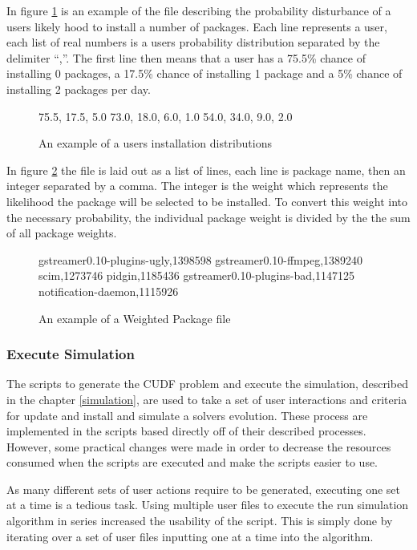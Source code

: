 In figure \ref{userprob} is an example of the file describing the probability disturbance of a users likely hood to install a number of packages.
Each line represents a user, each list of real numbers is a users probability distribution separated by the delimiter ``,''.
The first line then means that a user has a 75.5\% chance of installing 0 packages, a 17.5\% chance of installing 1 package and a 5\% chance of installing 2 packages per day.

\begin{figure}[htp]
\begin{center}
75.5, 17.5, 5.0
73.0, 18.0, 6.0, 1.0
54.0, 34.0, 9.0, 2.0
\caption[Install Distribution Example File]{An example of a users installation distributions}
\label{userprob}
\end{center}
\end{figure}

In figure \ref{packageprob} the file is laid out as a list of lines, each line is package name, then an integer separated by a comma.
The integer is the weight which represents the likelihood the package will be selected to be installed.
To convert this weight into the necessary probability, the individual package weight is divided by the the sum of all package weights. 

\begin{figure}[htp]
\begin{center}
gstreamer0.10-plugins-ugly,1398598
gstreamer0.10-ffmpeg,1389240
scim,1273746
pidgin,1185436
gstreamer0.10-plugins-bad,1147125
notification-daemon,1115926
\caption[Weighted Package File Example]{An example of a Weighted Package file }
\label{packageprob}
\end{center}
\end{figure}

\subsubsection{Execute Simulation}
The scripts to generate the CUDF problem and execute the simulation, described in the chapter \ref{simulation}, 
are used to take a set of user interactions and criteria for update and install and simulate a solvers evolution.
These process are implemented in the scripts based directly off of their described processes. 
However, some practical changes were made in order to decrease the resources consumed when the scripts are executed and make the scripts easier to use.

As many different sets of user actions require to be generated, executing one set at a time is a tedious task.
Using multiple user files to execute the run simulation algorithm in series increased the usability of the script.
This is simply done by iterating over a set of user files inputting one at a time into the algorithm. 

